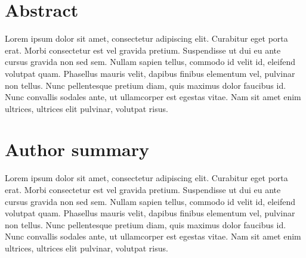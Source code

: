 \documentclass[10pt,letterpaper]{article}
\begin{document}

%
\section*{Abstract}
Lorem ipsum dolor sit amet, consectetur adipiscing elit. Curabitur eget porta erat. Morbi consectetur est vel gravida pretium. Suspendisse ut dui eu ante cursus gravida non sed sem. Nullam sapien tellus, commodo id velit id, eleifend volutpat quam. Phasellus mauris velit, dapibus finibus elementum vel, pulvinar non tellus. Nunc pellentesque pretium diam, quis maximus dolor faucibus id. Nunc convallis sodales ante, ut ullamcorper est egestas vitae. Nam sit amet enim ultrices, ultrices elit pulvinar, volutpat risus.



%
\section*{Author summary}
Lorem ipsum dolor sit amet, consectetur adipiscing elit. Curabitur eget porta erat. Morbi consectetur est vel gravida pretium. Suspendisse ut dui eu ante cursus gravida non sed sem. Nullam sapien tellus, commodo id velit id, eleifend volutpat quam. Phasellus mauris velit, dapibus finibus elementum vel, pulvinar non tellus. Nunc pellentesque pretium diam, quis maximus dolor faucibus id. Nunc convallis sodales ante, ut ullamcorper est egestas vitae. Nam sit amet enim ultrices, ultrices elit pulvinar, volutpat risus.


\clearpage
{}
\linenumbers

\end{document}
